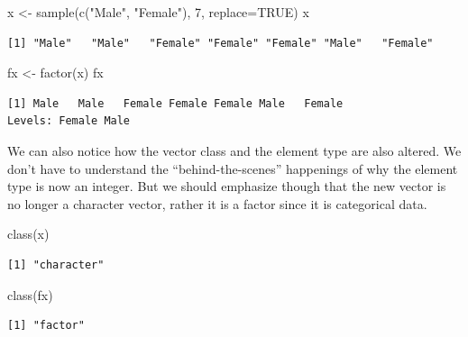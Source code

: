 \documentclass[
  letterpaper,
  DIV=11,
  numbers=noendperiod]{scrreprt}
\newenvironment{Shaded}{\begin{snugshade}}{\end{snugshade}}
\newcommand{\AttributeTok}[1]{\textcolor[rgb]{0.40,0.45,0.13}{#1}}
\newcommand{\ConstantTok}[1]{\textcolor[rgb]{0.56,0.35,0.01}{#1}}
\newcommand{\DecValTok}[1]{\textcolor[rgb]{0.68,0.00,0.00}{#1}}
\newcommand{\FunctionTok}[1]{\textcolor[rgb]{0.28,0.35,0.67}{#1}}
\newcommand{\NormalTok}[1]{\textcolor[rgb]{0.00,0.23,0.31}{#1}}
\newcommand{\OtherTok}[1]{\textcolor[rgb]{0.00,0.23,0.31}{#1}}
\newcommand{\StringTok}[1]{\textcolor[rgb]{0.13,0.47,0.30}{#1}}
\begin{document}
\begin{Shaded}
\begin{Highlighting}[]
\NormalTok{x }\OtherTok{\textless{}{-}} \FunctionTok{sample}\NormalTok{(}\FunctionTok{c}\NormalTok{(}\StringTok{"Male"}\NormalTok{, }\StringTok{"Female"}\NormalTok{), }\DecValTok{7}\NormalTok{, }\AttributeTok{replace=}\ConstantTok{TRUE}\NormalTok{)}
\NormalTok{x}
\end{Highlighting}
\end{Shaded}

\begin{verbatim}
[1] "Male"   "Male"   "Female" "Female" "Female" "Male"   "Female"
\end{verbatim}

\begin{Shaded}
\begin{Highlighting}[]
\NormalTok{fx }\OtherTok{\textless{}{-}} \FunctionTok{factor}\NormalTok{(x)}
\NormalTok{fx}
\end{Highlighting}
\end{Shaded}

\begin{verbatim}
[1] Male   Male   Female Female Female Male   Female
Levels: Female Male
\end{verbatim}

We can also notice how the vector class and the element type are also
altered. We don't have to understand the ``behind-the-scenes''
happenings of why the element type is now an integer. But we should
emphasize though that the new vector is no longer a character vector,
rather it is a factor since it is categorical data.

\begin{Shaded}
\begin{Highlighting}[]
\FunctionTok{class}\NormalTok{(x)}
\end{Highlighting}
\end{Shaded}

\begin{verbatim}
[1] "character"
\end{verbatim}

\begin{Shaded}
\begin{Highlighting}[]
\FunctionTok{class}\NormalTok{(fx)}
\end{Highlighting}
\end{Shaded}

\begin{verbatim}
[1] "factor"
\end{verbatim}
\end{document}
